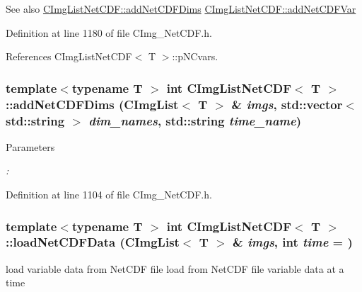 \begin{DoxySeeAlso}{See also}
\hyperlink{classCImgListNetCDF_aa6daeabeac3421f004136034abb702ba}{CImgListNetCDF::addNetCDFDims} \hyperlink{classCImgNetCDF_abae347b1449a8e6f65188ace2df5fee6}{CImgListNetCDF::addNetCDFVar} 
\end{DoxySeeAlso}


Definition at line 1180 of file CImg\_\-NetCDF.h.

References CImgListNetCDF$<$ T $>$::pNCvars.\hypertarget{classCImgListNetCDF_aa6daeabeac3421f004136034abb702ba}{
\subsubsection[{addNetCDFDims}]{\setlength{\rightskip}{0pt plus 5cm}template$<$typename T $>$ int {\bf CImgListNetCDF}$<$ T $>$::addNetCDFDims (CImgList$<$ T $>$ \& {\em imgs}, \/  std::vector$<$ std::string $>$ {\em dim\_\-names}, \/  std::string {\em time\_\-name})}}
\label{classCImgListNetCDF_aa6daeabeac3421f004136034abb702ba}

\begin{DoxyParams}{Parameters}
\item[{\em :}]\end{DoxyParams}

\begin{DoxyCode}
\end{DoxyCode}
 

Definition at line 1104 of file CImg\_\-NetCDF.h.\hypertarget{classCImgListNetCDF_aac1fa2f44b04270740f88900753ef02a}{
\subsubsection[{loadNetCDFData}]{\setlength{\rightskip}{0pt plus 5cm}template$<$typename T $>$ int {\bf CImgListNetCDF}$<$ T $>$::loadNetCDFData (CImgList$<$ T $>$ \& {\em imgs}, \/  int {\em time} = {})}}
\label{classCImgListNetCDF_aac1fa2f44b04270740f88900753ef02a}


load variable data from NetCDF file load from NetCDF file variable data at a time

